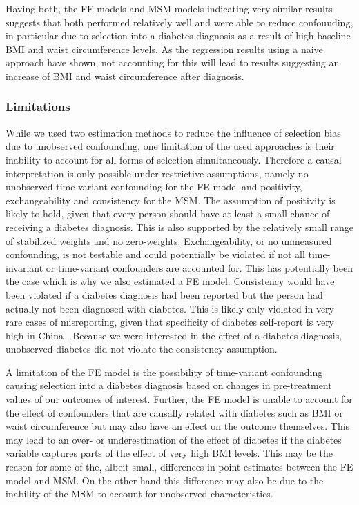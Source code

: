 Having both, the \ac{FE} models and \ac{MSM} models indicating very similar results suggests that both performed relatively well and were able to reduce confounding, in particular due to selection into a diabetes diagnosis as a result of high baseline \ac{BMI} and waist circumference levels. As the regression results using a naive approach have shown, not accounting for this will lead to results suggesting an increase of \ac{BMI} and waist circumference after diagnosis. 

\subsubsection*{Limitations}

While we used two estimation methods to reduce the influence of selection bias due to unobserved confounding, one limitation of the used approaches is their inability to account for all forms of selection simultaneously. Therefore a causal interpretation is only possible under restrictive assumptions, namely no unobserved time-variant confounding for the \ac{FE} model and positivity, exchangeability and consistency for the \ac{MSM}. The assumption of positivity is likely to hold, given that every person should have at least a small chance of receiving a diabetes diagnosis. This is also supported by the relatively small range of stabilized weights and no zero-weights. Exchangeability, or no unmeasured confounding, is not testable and could potentially be violated if not all time-invariant or time-variant confounders are accounted for. This has potentially been the case which is why we also estimated a \ac{FE} model. Consistency would have been violated if a diabetes diagnosis had been reported but the person had actually not been diagnosed with diabetes. This is likely only violated in very rare cases of misreporting, given that specificity of diabetes self-report is very high in China \autocite{Yuan2015}. Because we were interested in the effect of a diabetes diagnosis, unobserved diabetes did not violate the consistency assumption.

A limitation of the \ac{FE} model is the possibility of time-variant confounding causing selection into a diabetes diagnosis based on changes in pre-treatment values of our outcomes of interest. Further, the \ac{FE} model is unable to account for the effect of confounders that are causally related with diabetes such as \ac{BMI} or waist circumference but may also have an effect on the outcome themselves. This may lead to an over- or underestimation of the effect of diabetes if the diabetes variable captures parts of the effect of very high \ac{BMI} levels. This may be the reason for some of the, albeit small, differences in point estimates between the \ac{FE} model and \ac{MSM}. On the other hand this difference may also be due to the inability of the \ac{MSM} to account for unobserved characteristics.


